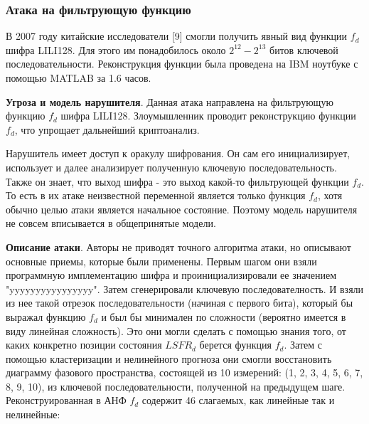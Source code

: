 \documentclass[colorthm]{./civarticle}
\begin{document}
\subsubsection{Атака на фильтрующую функцию}
В 2007 году китайские исследователи [9] смогли получить явный вид функции $f_d$ шифра LILI128. Для этого им понадобилось около $2^{12}-2^{13}$ битов ключевой последовательности. Реконструкция функции была проведена на IBM ноутбуке с помощью MATLAB за 1.6 часов.

\textbf{Угроза и модель нарушителя}. Данная атака направлена на фильтрующую функцию $f_d$ шифра LILI128. Злоумышленник проводит реконструкцию функции $f_d$, что упрощает дальнейший криптоанализ.

Нарушитель имеет доступ к оракулу шифрования. Он сам его инициализирует, использует и далее анализирует полученную ключевую последовательность. Также он знает, что выход шифра - это выход какой-то фильтрующей функции $f_d$. То есть в их атаке неизвестной переменной является только функция $f_d$, хотя обычно целью атаки является начальное состояние. Поэтому модель нарушителя не совсем вписывается в общепринятые модели.

\textbf{Описание атаки}. Авторы не приводят точного алгоритма атаки, но описывают основные приемы, которые были применены.
    Первым шагом они взяли программную имплементацию шифра и проинициализировали ее значением "yyyyyyyyyyyyyyyy". Затем сгенерировали ключевую последователность. И взяли из нее такой отрезок последовательности (начиная с первого бита), который бы выражал функцию $f_d$ и был бы минимален по сложности (вероятно имеется в виду линейная сложность). Это они могли сделать с помощью знания того, от каких конкретно позиции состояния $LSFR_d$ берется функция $f_d$. Затем с помощью кластеризации и нелинейного прогноза они смогли восстановить диаграмму фазового пространства, состоящей из 10 измерений: (1, 2, 3, 4, 5, 6, 7, 8, 9, 10), из ключевой последовательности, полученной на предыдущем шаге. Реконструированная в АНФ $f_d$ содержит 46 слагаемых, как линейные так и нелинейные:
\end{document}
